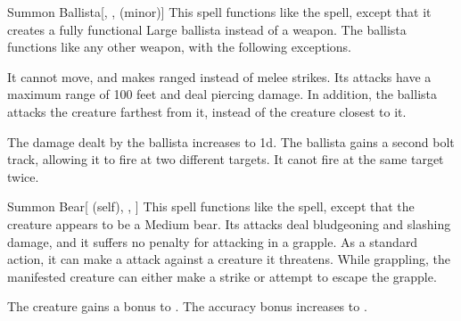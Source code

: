 \lowercase{\hypertarget{spell:Summon Ballista}{}}\label{spell:Summon Ballista}
\begin{freeability}[Rank 3]{\hypertarget{spell:Summon Ballista}{Summon Ballista}}[, ,  (minor)]
This spell functions like the  spell, except that it creates a fully functional Large ballista instead of a weapon.
The ballista functions like any other weapon, with the following exceptions.

It cannot move, and makes ranged  instead of melee strikes.
Its attacks have a maximum range of 100 feet and deal piercing damage.
In addition, the ballista attacks the creature farthest from it, instead of the creature closest to it.

\rankline
{} The damage dealt by the ballista increases to  \minus1d.
 The ballista gains a second bolt track, allowing it to fire at two different targets.
It canot fire at the same target twice.
\end{freeability}
\vspace{0.25em}



\lowercase{\hypertarget{spell:Summon Bear}{}}\label{spell:Summon Bear}
\begin{attuneability}[Rank 3]{\hypertarget{spell:Summon Bear}{Summon Bear}}[ (self), , ]
This spell functions like the  spell, except that the creature appears to be a Medium bear.
Its attacks deal bludgeoning and slashing damage, and it suffers no penalty for attacking in a grapple.
As a standard action, it can make a  attack against a creature it threatens.
While grappling, the manifested creature can either make a strike or attempt to escape the grapple.

\rankline
{} The creature gains a  bonus to .
 The accuracy bonus increases to .
\end{attuneability}
\vspace{0.25em}



